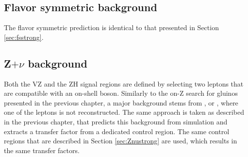 \subsection*{Flavor symmetric background}
\noindent\justify
The flavor symmetric prediction is identical to that presented in Section \ref{sec:fsstrong}. 
\subsection*{Z$+\nu$ background}
\noindent\justify
Both the VZ and the ZH signal regions are defined by selecting two leptons that are compatible with an on-shell \PZ boson. 
Similarly to the on-Z search for gluinos presented in the previous chapter, a major background stems from \PZZ, \PWZ or \ttZ, where one of the leptons is not reconstructed. 
The same approach is taken as described in the previous chapter, that predicts this background from simulation and extracts a transfer factor from a dedicated control region. 
The same control regions that are described in Section \ref{sec:Znustrong} are used, which results in the same transfer factors. 
